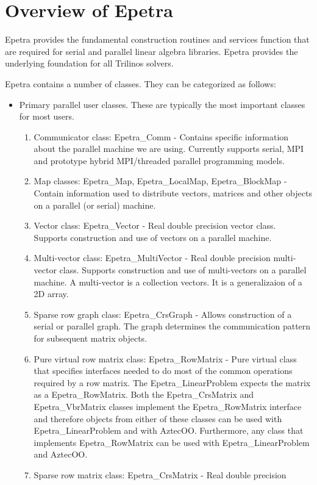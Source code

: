 \section{Overview of Epetra}

Epetra provides the fundamental construction
routines and services function that are required for serial and
parallel linear algebra libraries.  Epetra provides the underlying
foundation for all Trilinos solvers.

Epetra contains a number of classes.  They can be categorized as follows:
\begin{itemize}
\item Primary parallel user classes.  These are typically the most
  important classes for most users.
\begin{enumerate}
\item Communicator class: Epetra\_Comm - Contains specific information
  about the parallel machine we are using.  Currently supports serial,
  MPI and prototype hybrid MPI/threaded parallel programming models.
\item Map classes: Epetra\_Map, Epetra\_LocalMap, Epetra\_BlockMap -
  Contain information used to distribute vectors, matrices and other
  objects on a parallel (or serial) machine.
\item Vector class: Epetra\_Vector - Real double precision vector class.
  Supports construction and use of vectors on a parallel machine.
\item Multi-vector class: Epetra\_MultiVector - Real double precision
  multi-vector class.  Supports construction and use of multi-vectors on
  a parallel machine.  A multi-vector is a collection vectors.  It is a
  generalizaion of a 2D array.
\item Sparse row graph class: Epetra\_CrsGraph - Allows construction of a
  serial or parallel graph.  The graph determines the communication
  pattern for subsequent matrix objects.
\item Pure virtual row matrix class: Epetra\_RowMatrix - Pure virtual
  class that specifies interfaces needed to do most of the common
  operations required by a row matrix.  The Epetra\_LinearProblem expects
  the matrix as a Epetra\_RowMatrix.  Both the Epetra\_CrsMatrix and
  Epetra\_VbrMatrix classes implement the Epetra\_RowMatrix interface and
  therefore objects from either of these classes can be used with
  Epetra\_LinearProblem and with AztecOO.  Furthermore, any class that
  implements Epetra\_RowMatrix can be used with Epetra\_LinearProblem and
  AztecOO.
\item Sparse row matrix class: Epetra\_CrsMatrix - Real double precision

\end{enumerate}
\end{itemize}
